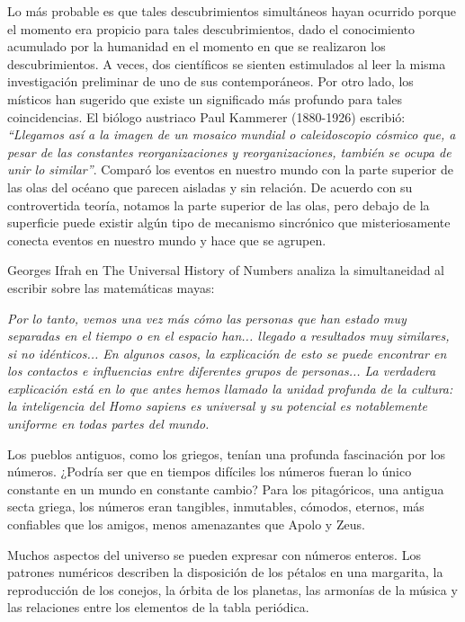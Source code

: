 \documentclass{article}
\begin{document}
Lo m\'as probable es que tales descubrimientos simult\'aneos hayan ocurrido porque
el momento era propicio para tales descubrimientos, dado el conocimiento
acumulado por la humanidad en el momento en que se realizaron los
descubrimientos. A veces, dos cient\'ificos se sienten estimulados al leer la
misma investigaci\'on preliminar de uno de sus contempor\'aneos. Por otro lado, los
m\'isticos han sugerido que existe un significado m\'as profundo para tales
coincidencias. El bi\'ologo austriaco Paul Kammerer (1880-1926) escribi\'o:
\textit{“Llegamos as\'i a la imagen de un mosaico mundial o caleidoscopio c\'osmico que, a
pesar de las constantes reorganizaciones y reorganizaciones, tambi\'en se ocupa de
unir lo similar”}. Compar\'o los eventos en nuestro mundo con la parte superior de
las olas del oc\'eano que parecen aisladas y sin relaci\'on. De acuerdo con su
controvertida teor\'ia, notamos la parte superior de las olas, pero debajo de la
superficie puede existir alg\'un tipo de mecanismo sincr\'onico que misteriosamente
conecta eventos en nuestro mundo y hace que se agrupen.

Georges Ifrah en The Universal History of Numbers analiza la simultaneidad al
escribir sobre las matem\'aticas mayas:

\textit{Por lo tanto, vemos una vez m\'as c\'omo las personas que han estado muy separadas
en el tiempo o en el espacio han... llegado a resultados muy similares, si no
id\'enticos... En algunos casos, la explicaci\'on de esto se puede encontrar en los
contactos e influencias entre diferentes grupos de personas... La verdadera
explicaci\'on est\'a en lo que antes hemos llamado la unidad profunda de la cultura:
la inteligencia del Homo sapiens es universal y su potencial es notablemente
uniforme en todas partes del mundo.}

Los pueblos antiguos, como los griegos, ten\'ian una profunda fascinaci\'on por los
n\'umeros. ¿Podr\'ia ser que en tiempos dif\'iciles los n\'umeros fueran lo \'unico
constante en un mundo en constante cambio? Para los pitag\'oricos, una antigua
secta griega, los n\'umeros eran tangibles, inmutables, c\'omodos, eternos, m\'as
confiables que los amigos, menos amenazantes que Apolo y Zeus.

Muchos aspectos del universo se pueden expresar con n\'umeros enteros. Los
patrones num\'ericos describen la disposici\'on de los p\'etalos en una margarita, la
reproducci\'on de los conejos, la \'orbita de los planetas, las armon\'ias de la
m\'usica y las relaciones entre los elementos de la tabla peri\'odica.
\end{document}
